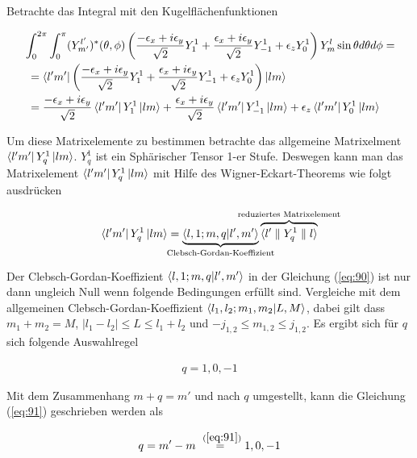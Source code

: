 Betrachte das Integral mit den Kugelflächenfunktionen

\begin{align}
  \label{eq:89}
  &\int_0^{2\pi} \int_0^\pi (Y^{l'}_{m'})^*(\theta,\phi) \left(  \frac{-\epsilon_x+i\epsilon_y}{\sqrt{2}}Y^1_1  + \frac{\epsilon_x+i\epsilon_y}{\sqrt{2}}Y^1_{-1} + \epsilon_z Y^1_0   \right) Y^{l}_{m} \sin\theta d\theta d\phi = \notag \\
&\,\,= \left\langle l'm' \right|\left(  \frac{-\epsilon_x+i\epsilon_y}{\sqrt{2}}Y^1_1  + \frac{\epsilon_x+i\epsilon_y}{\sqrt{2}}Y^1_{-1} + \epsilon_z Y^1_0   \right)\left| lm \right\rangle \notag \\
&\,\,=  \frac{-\epsilon_x+i\epsilon_y}{\sqrt{2}} \left\langle l'm' \right| Y^1_1\left| lm \right\rangle  + \frac{\epsilon_x+i\epsilon_y}{\sqrt{2}}\left\langle l'm' \right| Y^1_{-1}\left| lm \right\rangle + \epsilon_z \left\langle l'm' \right| Y^1_0 \left| lm \right\rangle \notag \\
\end{align}

Um diese Matrixelemente zu bestimmen betrachte das allgemeine Matrixelment \(\left\langle l'm' \right| Y^1_{q}\left| lm \right\rangle\). \(Y^1_{q}\) ist ein Sphärischer Tensor 1-er Stufe. Deswegen kann man das Matrixelement \(\left\langle l'm' \right| Y^1_{q}\left| lm \right\rangle\) mit Hilfe des Wigner-Eckart-Theorems wie folgt ausdrücken

\begin{align}
  \label{eq:90}
  \bra{l'm'} Y^1_{q}\ket{lm} = \underbr{\braket{ l,1;m,q }{l',m'}}_{\text{Clebsch-Gordan-Koeffizient}}\overbr{ \langle l' \parallel Y^1_{q} \parallel l \rangle}^{\text{reduziertes Matrixelement}}
\end{align}

Der Clebsch-Gordan-Koeffizient \( \braket{ l,1;m,q }{l',m'} \) in der Gleichung (\ref{eq:90}) ist nur dann ungleich Null wenn folgende Bedingungen erfüllt sind. Vergleiche mit dem allgemeinen  Clebsch-Gordan-Koeffizient \( \braket{ l_1,l_2;m_1,m_2 }{L,M} \), dabei gilt dass \(m_1+m_2=M\), \(|l_1-l_2|\le L \le l_1+l_2\) und \(-j_{1,2}\le m_{1,2} \le j_{1,2}\). Es ergibt sich für \(q\) sich folgende Auswahlregel

\begin{align}
  \label{eq:91}
    q = 1,0,-1
\end{align}

Mit dem Zusammenhang \(m+q=m'\) und nach \(q\) umgestellt,  kann die Gleichung (\ref{eq:91}) geschrieben werden als

\begin{align}
  \label{eq:92}
  q=m'-m \stackrel{~(\ref{eq:91})}= 1,0,-1
\end{align}

